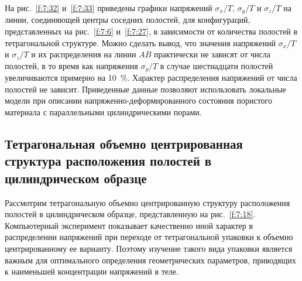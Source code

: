 На рис.~\ref{f:7:32} и~\ref{f:7:33} приведены графики напряжений $\sigma_x/T$, $\sigma_y/T$ и $\sigma_z/T$ на линии, соединяющей центры соседних полостей, для конфигураций, представленных на рис.~\ref{f:7:6} и~\ref{f:7:27}, в зависимости от количества полостей в тетрагональной структуре. Можно сделать вывод, что значения напряжений $\sigma_x/T$ и $\sigma_z/T$ и их распределения на линии $AB$ практически не зависят от числа полостей, в то время как напряжения $\sigma_y/T$ в случае шестнадцати полостей увеличиваются примерно на 10~\%. Характер распределения напряжений от числа полостей не зависит. Приведенные данные позволяют использовать локальные модели при описании напряженно-деформированного состояния пористого материала с параллельными цилиндрическими порами.

\subsection{Тетрагональная объемно центрированная структура расположения полостей в цилиндрическом образце}

% 

Рассмотрим тетрагональную объемно центрированную структуру расположения полостей в цилиндрическом образце, представленную на рис.~\ref{f:7:18}. Компьютерный эксперимент показывает качественно иной характер в распределении напряжений при переходе от тетрагональной упаковки к объемно центрированному ее варианту. Поэтому изучение такого вида упаковки является важным для оптимального определения геометрических параметров, приводящих к наименьшей концентрации напряжений в теле.

